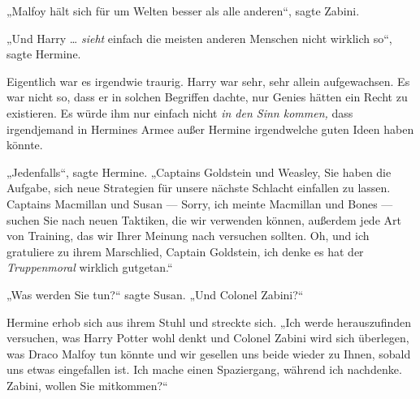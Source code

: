 „Malfoy hält sich für um Welten besser als alle anderen“, sagte Zabini.

„Und Harry … \emph{sieht} einfach die meisten anderen Menschen nicht wirklich so“, sagte Hermine.

Eigentlich war es irgendwie traurig. Harry war sehr, sehr allein aufgewachsen. Es war nicht so, dass er in solchen Begriffen dachte, nur Genies hätten ein Recht zu existieren. Es würde ihm nur einfach nicht \emph{in den Sinn kommen,} dass irgendjemand in Hermines Armee außer Hermine irgendwelche guten Ideen haben könnte.

„Jedenfalls“, sagte Hermine.
„Captains Goldstein und Weasley, Sie haben die Aufgabe, sich neue Strategien für unsere nächste Schlacht einfallen zu lassen. Captains Macmillan und Susan — Sorry, ich meinte Macmillan und Bones — suchen Sie nach neuen Taktiken, die wir verwenden können, außerdem jede Art von Training, das wir Ihrer Meinung nach versuchen sollten. Oh, und ich gratuliere zu ihrem Marschlied, Captain Goldstein, ich denke es hat der \emph{Truppenmoral} wirklich gutgetan.“

„Was werden Sie tun?“ sagte Susan.
„Und Colonel Zabini?“

Hermine erhob sich aus ihrem Stuhl und streckte sich.
„Ich werde herauszufinden versuchen, was Harry Potter wohl denkt und Colonel Zabini wird sich überlegen, was Draco Malfoy tun könnte und wir gesellen uns beide wieder zu Ihnen, sobald uns etwas eingefallen ist. Ich mache einen Spaziergang, während ich nachdenke. Zabini, wollen Sie mitkommen?“

